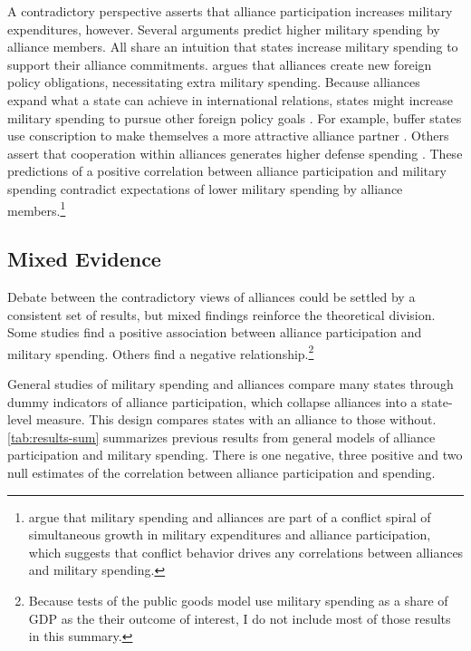 \documentclass[12pt]{article}
\begin{document}
A contradictory perspective asserts that alliance participation increases military expenditures, however. 
Several arguments predict higher military spending by alliance members.
All share an intuition that states increase military spending to support their alliance commitments. 
\citet{Diehl1994} argues that alliances create new foreign policy obligations, necessitating extra military spending.
Because alliances expand what a state can achieve in international relations, states might increase military spending to pursue other foreign policy goals \citep{MorganPalmer2006}.
For example, buffer states use conscription to make themselves a more attractive alliance partner \citep{Horowitzetal2017}.
Others assert that cooperation within alliances generates higher defense spending \citep{Palmer1990, QuirozFlores2011}. 
These predictions of a positive correlation between alliance participation and military spending contradict expectations of lower military spending by alliance members.\footnote{
\citet{SeneseVasquez2008} argue that military spending and alliances are part of a conflict spiral of simultaneous growth in military expenditures and alliance participation, which suggests that conflict behavior drives any correlations between alliances and military spending. 
}


\subsection*{Mixed Evidence} 


Debate between the contradictory views of alliances could be settled by a consistent set of results, but mixed findings reinforce the theoretical division.
Some studies find a positive association between alliance participation and military spending. 
Others find a negative relationship.\footnote{
Because tests of the public goods model use military spending as a share of GDP as the their outcome of interest, I do not include most of those results in this summary.} 


General studies of military spending and alliances compare many states through dummy indicators of alliance participation, which collapse alliances into a state-level measure. 
This design compares states with an alliance to those without.
\autoref{tab:results-sum} summarizes previous results from general models of alliance participation and military spending. 
There is one negative, three positive and two null estimates of the correlation between alliance participation and spending. 
\end{document}
